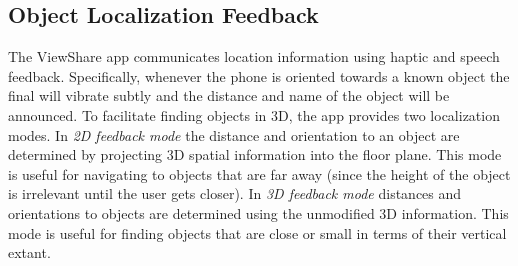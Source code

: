 \documentclass[chi_draft]{sigchi}
\begin{document}
\subsection{Object Localization Feedback}
The ViewShare app communicates location information using haptic and speech feedback.  Specifically, whenever the phone is oriented towards a known object the final will vibrate subtly and the distance and name of the object will be announced.  To facilitate finding objects in 3D, the app provides two localization modes.  In \emph{2D feedback mode} the distance and orientation to an object are determined by projecting 3D spatial information into the floor plane.  This mode is useful for navigating to objects that are far away (since the height of the object is irrelevant until the user gets closer).  In \emph{3D feedback mode} distances and orientations to objects are determined using the unmodified 3D information.  This mode is useful for finding objects that are close or small in terms of their vertical extant.%
\end{document}
